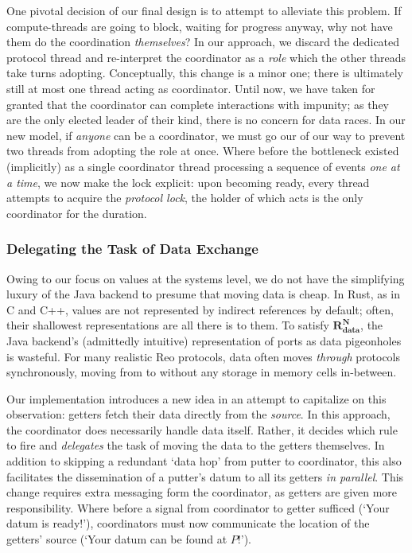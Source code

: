 One pivotal decision of our final design is to attempt to alleviate this problem. If compute-threads are going to block, waiting for progress anyway, why not have them do the coordination \textit{themselves}? In our approach, we discard the dedicated protocol thread and re-interpret the coordinator as a \textit{role} which the other threads take turns adopting. Conceptually, this change is a minor one; there is ultimately still at most one thread acting as coordinator. Until now, we have taken for granted that the coordinator can complete interactions with impunity; as they are the only elected leader of their kind, there is no concern for data races. In our new model, if \textit{anyone} can be a coordinator, we must go our of our way to prevent two threads from adopting the role at once. Where before the bottleneck existed (implicitly) as a single coordinator thread processing a sequence of events \textit{one at a time}, we now make the lock explicit: upon becoming ready, every thread attempts to acquire the \textit{protocol lock}, the holder of which acts is the only coordinator for the duration.

\subsubsection{Delegating the Task of Data Exchange}
Owing to our focus on values at the systems level, we do not have the simplifying luxury of the Java backend to presume that moving data is cheap. In Rust, as in C and C++, values are not represented by indirect references by default; often, their shallowest representations are all there is to them. To satisfy $\boldsymbol{R^N_{data}}$, the Java backend's (admittedly intuitive) representation of ports as data pigeonholes is wasteful. For many realistic Reo protocols, data often moves \textit{through} protocols synchronously, moving from  to  without any storage in memory cells in-between. 

Our implementation introduces a new idea in an attempt to capitalize on this observation: getters fetch their data directly from the \textit{source}. In this approach, the coordinator does necessarily handle data itself. Rather, it decides which rule to fire and \textit{delegates} the task of moving the data to the getters themselves. In addition to skipping a redundant `data hop' from putter to coordinator, this also facilitates the dissemination of a putter's datum to all its getters \textit{in parallel}. This change requires extra messaging form the coordinator, as getters are given more responsibility. Where before a signal from coordinator to getter sufficed (`Your datum is ready!'), coordinators must now communicate the location of the getters' source (`Your datum can be found at $P$!').


